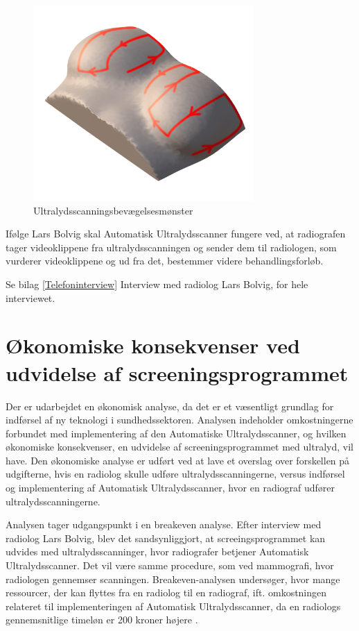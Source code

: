 \begin{figure}[H]
    \centering
    \includegraphics[width=0.75\textwidth]{figurer/d/probebevagelse}
    \caption{Ultralydsscanningsbevægelsesmønster}
    \label{Probensbevagelse}
\end{figure}

Ifølge Lars Bolvig skal Automatisk Ultralydsscanner fungere ved, at radiografen tager videoklippene fra ultralydsscanningen og sender dem til radiologen, som vurderer videoklippene og ud fra det, bestemmer videre behandlingsforløb.

Se bilag \ref{Telefoninterview} Interview med radiolog Lars Bolvig, for hele interviewet. 

\section{Økonomiske konsekvenser ved udvidelse af screeningsprogrammet} 
Der er udarbejdet en økonomisk analyse, da det er et væsentligt grundlag for indførsel af ny teknologi i sundhedssektoren. Analysen indeholder omkostningerne forbundet med implementering af den Automatiske Ultralydsscanner, og hvilken økonomiske konsekvenser, en udvidelse af screeningsprogrammet med ultralyd, vil have. Den økonomiske analyse er udført ved at lave et overslag over forskellen på udgifterne, hvis en radiolog skulle udføre ultralydsscanningerne, versus indførsel og implementering af Automatisk Ultralydsscanner, hvor en radiograf udfører ultralydsscanningerne. 

Analysen tager udgangspunkt i en breakeven analyse.  Efter interview med radiolog Lars Bolvig, blev det sandsynliggjort, at screeingsprogrammet kan udvides med ultralydsscanninger, hvor radiografer betjener Automatisk Ultralydsscanner. Det vil være samme procedure, som ved mammografi, hvor radiologen gennemser scanningen. Breakeven-analysen undersøger, hvor mange ressourcer, der kan flyttes fra en radiolog til en radiograf, ift. omkostningen relateret til implementeringen af Automatisk Ultralydsscanner, da en radiologs gennemsnitlige timeløn er 200 kroner højere \cite{Lon}.

